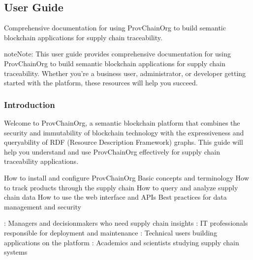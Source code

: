 \documentclass[letterpaper,10pt,english]{sphinxmanual}
\begin{document}
\sphinxstepscope


\subsection{User Guide}
\label{\detokenize{user-guide/index:user-guide}}\label{\detokenize{user-guide/index::doc}}
\sphinxAtStartPar
Comprehensive documentation for using ProvChainOrg to build semantic blockchain applications for supply chain traceability.



\begin{sphinxadmonition}{note}{Note:}
\sphinxAtStartPar
This user guide provides comprehensive documentation for using ProvChainOrg to build semantic blockchain applications for supply chain traceability. Whether you’re a business user, administrator, or developer getting started with the platform, these resources will help you succeed.
\end{sphinxadmonition}


\subsubsection{Introduction}
\label{\detokenize{user-guide/index:introduction}}
\sphinxAtStartPar
Welcome to ProvChainOrg, a semantic blockchain platform that combines the security and immutability of blockchain technology with the expressiveness and queryability of RDF (Resource Description Framework) graphs. This guide will help you understand and use ProvChainOrg effectively for supply chain traceability applications.

\sphinxAtStartPar
{}
\sphinxhyphen{} How to install and configure ProvChainOrg
\sphinxhyphen{} Basic concepts and terminology
\sphinxhyphen{} How to track products through the supply chain
\sphinxhyphen{} How to query and analyze supply chain data
\sphinxhyphen{} How to use the web interface and APIs
\sphinxhyphen{} Best practices for data management and security

\sphinxAtStartPar
{}
\sphinxhyphen{} : Managers and decision\sphinxhyphen{}makers who need supply chain insights
\sphinxhyphen{} : IT professionals responsible for deployment and maintenance
\sphinxhyphen{} : Technical users building applications on the platform
\sphinxhyphen{} : Academics and scientists studying supply chain systems
\end{document}
